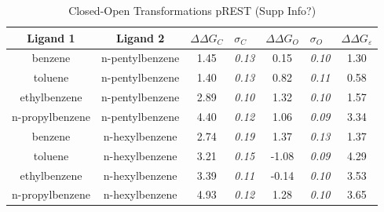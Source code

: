\documentclass[T4paper.tex]{subfiles}
\begin{document}
\begin{table}[!htb]
\centering
\caption{Closed-Open Transformations pREST (Supp Info?)}
\label{tbl:C-O_pREST}
\begin{tabular}{|c|c|c|l|c|l|c|}
\hline
\textbf{Ligand 1}       & \textbf{Ligand 2}    & {\color[HTML]{800080} \boldmath$\Delta\Delta G_{C}$} & {\color[HTML]{800080} \boldmath$\sigma_{C}$} & {\color[HTML]{008000} \boldmath$\Delta\Delta G_{O}$} & {\color[HTML]{008000} \boldmath$\sigma_{O}$} & \boldmath$\Delta\Delta G_{\varepsilon}$\\ \hline
\cellcolor[HTML]{800080}benzene         & \cellcolor[HTML]{008000}n-pentylbenzene & 1.45                                   & \textit{0.13}                       & 0.15                                & \textit{0.10}                       & \cellcolor[HTML]{FFCCC9}1.30 \\ \hline
\cellcolor[HTML]{800080}toluene         & \cellcolor[HTML]{008000}n-pentylbenzene & 1.40                                   & \textit{0.13}                       & 0.82                                 & \textit{0.11}                       & \cellcolor[HTML]{9AFF99}0.58 \\ \hline
\cellcolor[HTML]{800080}ethylbenzene    & \cellcolor[HTML]{008000}n-pentylbenzene & 2.89                                   & \textit{0.10}                       & 1.32                                 & \textit{0.10}                       & \cellcolor[HTML]{FFCCC9}1.57 \\ \hline
\cellcolor[HTML]{800080}n-propylbenzene & \cellcolor[HTML]{008000}n-pentylbenzene & 4.40                                   & \textit{0.12}                       & 1.06                                & \textit{0.09}                       & \cellcolor[HTML]{FFCCC9}3.34 \\ \hline
\cellcolor[HTML]{800080}benzene         & \cellcolor[HTML]{008000}n-hexylbenzene  & 2.74                                   & \textit{0.19}                       & 1.37                                & \textit{0.13}                       & \cellcolor[HTML]{FFCCC9}1.37 \\ \hline
\cellcolor[HTML]{800080}toluene         & \cellcolor[HTML]{008000}n-hexylbenzene  & 3.21                                   & \textit{0.15}                       & -1.08                                & \textit{0.09}                       & \cellcolor[HTML]{FFCCC9}4.29 \\ \hline
\cellcolor[HTML]{800080}ethylbenzene    & \cellcolor[HTML]{008000}n-hexylbenzene  & 3.39                                   & \textit{0.11}                       & -0.14                                & \textit{0.10}                       & \cellcolor[HTML]{FFCCC9}3.53 \\ \hline
\cellcolor[HTML]{800080}n-propylbenzene & \cellcolor[HTML]{008000}n-hexylbenzene  & 4.93                                   & \textit{0.12}                       & 1.28                                 & \textit{0.10}                       & \cellcolor[HTML]{FFCCC9}3.65 \\ \hline
\end{tabular}

\end{table}
\end{document}
